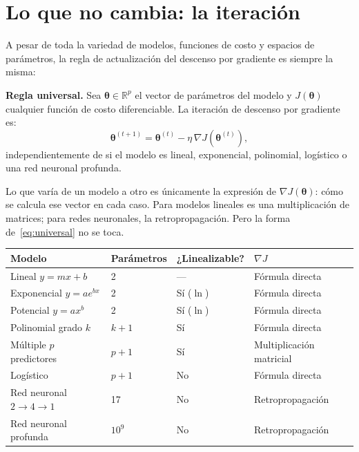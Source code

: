\documentclass[12pt, a4paper]{article}
\newenvironment{vizdef}{%
    \begin{mdframed}[style=vizazul]
}{%
    \end{mdframed}
}
\newcommand{\R}{\mathbb{R}}
\newcommand{\grad}{\nabla}
\newcommand{\btheta}{\boldsymbol{\theta}}
\begin{document}
\section{Lo que no cambia: la iteración}

A pesar de toda la variedad de modelos, funciones de costo y espacios
de parámetros, la regla de actualización del descenso por gradiente es
siempre la misma:

\begin{vizdef}
\textbf{Regla universal.} Sea $\btheta \in \R^p$ el vector de parámetros
del modelo y $J(\btheta)$ cualquier función de costo diferenciable.
La iteración de descenso por gradiente es:
\begin{equation}\label{eq:universal}
    \btheta^{(t+1)} = \btheta^{(t)} - \eta\,\grad J\!\left(\btheta^{(t)}\right),
\end{equation}
independientemente de si el modelo es lineal, exponencial, polinomial,
logístico o una red neuronal profunda.
\end{vizdef}

Lo que varía de un modelo a otro es únicamente la expresión de
$\grad J(\btheta)$: cómo se calcula ese vector en cada caso.
Para modelos lineales es una multiplicación de matrices; para redes
neuronales, la retropropagación. Pero la forma de~\eqref{eq:universal}
no se toca.

\begin{center}
\small
\begin{tabular}{llll}
    \toprule
    \textbf{Modelo} & \textbf{Parámetros} & \textbf{¿Linealizable?} & \textbf{$\grad J$} \\
    \midrule
    Lineal $y = mx + b$          & 2        & —          & Fórmula directa \\
    Exponencial $y = ae^{bx}$    & 2        & Sí ($\ln$) & Fórmula directa \\
    Potencial $y = ax^b$         & 2        & Sí ($\ln$) & Fórmula directa \\
    Polinomial grado $k$         & $k+1$    & Sí         & Fórmula directa \\
    Múltiple $p$ predictores     & $p+1$    & Sí         & Multiplicación matricial \\
    Logístico                    & $p+1$    & No         & Fórmula directa \\
    Red neuronal $2\to 4\to 1$   & 17       & No         & Retropropagación \\
    Red neuronal profunda        & $10^{9}$ & No         & Retropropagación \\
    \bottomrule
\end{tabular}
\end{center}
\end{document}
